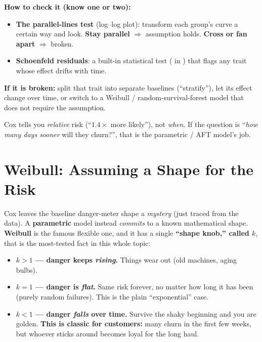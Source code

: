 \documentclass[11pt]{article}
\newcommand{\code}[1]{\texttt{\detokenize{#1}}}
\begin{document}
\textbf{How to check it (know one or two):}
\begin{itemize}[leftmargin=1.4em]
  \item \textbf{The parallel-lines test} (log--log plot): transform each group's curve a certain way
  and look. \textbf{Stay parallel} $\Rightarrow$ assumption holds. \textbf{Cross or fan apart}
  $\Rightarrow$ broken.
  \item \textbf{Schoenfeld residuals}: a built-in statistical test (\code{cph.check_assumptions} in
  \code{lifelines}) that flags any trait whose effect drifts with time.
\end{itemize}

\textbf{If it is broken:} split that trait into separate baselines (``stratify''), let its effect
change over time, or switch to a Weibull / random-survival-forest model that does not require the
assumption.

\begin{tipbox}
Cox tells you \emph{relative} risk (``$1.4\times$ more likely''), not \emph{when}. If the question is
``\emph{how many days sooner} will they churn?'', that is the parametric / AFT model's job.
\end{tipbox}

\section{Weibull: Assuming a Shape for the Risk}

Cox leaves the baseline danger-meter shape a \emph{mystery} (just traced from the data). A
\textbf{parametric} model instead \emph{commits} to a known mathematical shape. \textbf{Weibull} is
the famous flexible one, and it has a single \textbf{``shape knob,'' called $k$}, that is the
most-tested fact in this whole topic:

\begin{plainbox}
\begin{itemize}[leftmargin=1.2em,topsep=2pt]
  \item \textbf{$k>1$ --- danger keeps \emph{rising}.} Things wear out (old machines, aging bulbs).
  \item \textbf{$k=1$ --- danger is \emph{flat}.} Same risk forever, no matter how long it has been
  (purely random failures). This is the plain ``exponential'' case.
  \item \textbf{$k<1$ --- danger \emph{falls} over time.} Survive the shaky beginning and you are
  golden. \textbf{This is classic for customers:} many churn in the first few weeks, but whoever
  sticks around becomes loyal for the long haul.
\end{itemize}
\end{plainbox}
\end{document}
